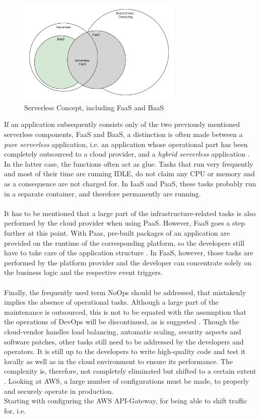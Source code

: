 \documentclass[a4paper,11pt, pagesize]{scrartcl}
\begin{document}
\begin{spacing}{1.2}
\begin{figure}[H]
\label{fig:serverlessBaaSandPaas}
\centering
\includegraphics[width=0.7\textwidth]{Serverless}
\caption{Serverless Concept, including FaaS and BaaS}
\end{figure} 
If an application subsequently consists only of the two previously mentioned serverless components, FaaS and BaaS, a distinction is often made between a \textit{pure serverless} application, i.e. an application whose operational part has been completely outsourced to a cloud provider, and a \textit{hybrid serverless} application \cite{leitner2019mixed}. In the latter case, the functions often act as glue. Tasks that run very frequently and most of their time are running IDLE, do not claim any CPU or memory and as a consequence are not charged for. In IaaS and PaaS, these tasks probably run in a separate container, and therefore permanently are running.\\\\ It has to be mentioned that a large part of the infrastructure-related tasks is also performed by the cloud provider when using PaaS. However, FaaS goes a step further at this point. With Paas, pre-built packages of an application are provided on the runtime of the corresponding platform, so the developers still have to take care of the application structure \cite{kaplan2019framework}. In FaaS, however, those tasks are performed by the platform provider and the developer can concentrate solely on the business logic and the respective event triggers.\\\\ Finally, the frequently used term \glqq NoOps\grqq{} \cite{fowler2018serverless} should be addressed, that mistakenly implies the absence of operational tasks. Although a large part of the maintenance is outsourced, this is not to be equated with the assumption that the operations of DevOps will be discontinued, as is suggested \cite{fowler2018serverless}.  Though the cloud-vendor handles load balancing, automatic scaling, security aspects and software patches, other tasks still need to be addressed by the developers and operators. It is still up to the developers to write high-quality code and test it locally as well as in the cloud environment to ensure its performance. The complexity is, therefore, not completely eliminated but shifted to a certain extent \cite{eivy2017wary}. Looking at AWS, a large number of configurations must be made, to properly and securely operate in production.\\ Starting with configuring the AWS API-Gateway, for being able to shift traffic for, i.e. 
\end{spacing}
\end{document}
